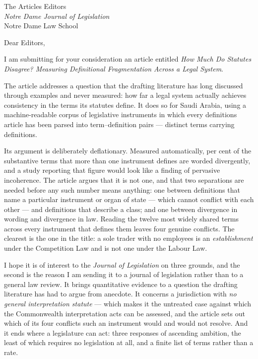 \documentclass[11pt]{letter}
\begin{document}
\begin{letter}{The Articles Editors\\
\emph{Notre Dame Journal of Legislation}\\
Notre Dame Law School}

\opening{Dear Editors,}

I am submitting for your consideration an article entitled \emph{How Much Do
Statutes Disagree? Measuring Definitional Fragmentation Across a Legal
System}.

The article addresses a question that the drafting literature has long
discussed through examples and never measured: how far a legal system
actually achieves consistency in the terms its statutes define. It does so
for Saudi Arabia, using a machine-readable corpus of \nInstruments{}
legislative instruments in which every definitions article has been parsed into
term--definition pairs --- \nTerms{} distinct terms carrying \nDefinitions{}
definitions.

Its argument is deliberately deflationary. Measured automatically, \nDivergentShare{} per
cent of the substantive terms that more than one instrument defines are
worded divergently, and a study reporting that figure would look like a
finding of pervasive incoherence. The article argues that it is not one, and
that two separations are needed before any such number means anything: one
between definitions that name a particular instrument or organ of state ---
which cannot conflict with each other --- and definitions that describe a
class; and one between divergence in wording and divergence in law. Reading
the twelve most widely shared terms across every instrument that defines
them leaves four genuine conflicts. The clearest is the one in the title:
a sole trader with no employees is an \emph{establishment} under the
Competition Law and is not one under the Labour Law.

I hope it is of interest to the \emph{Journal of Legislation} on three grounds, and the second is the reason I am sending it to a journal of legislation rather than to a general law review. It brings quantitative evidence to a question the drafting literature
has had to argue from anecdote. It concerns a jurisdiction with \emph{no
general interpretation statute} --- which makes it the untreated case against
which the Commonwealth interpretation acts can be assessed, and the article
sets out which of its four conflicts such an instrument would and would not
resolve. And it ends where a legislature can act: three responses of ascending ambition, the least of which requires no legislation at all, and a finite list of terms rather than a rate.


\end{letter}
\end{document}
